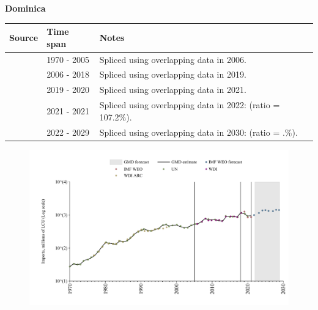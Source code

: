 \documentclass[12pt,a4paper,landscape]{article}
\begin{document}
\begin{adjustbox}{max totalsize={\paperwidth}{\paperheight},center}
\begin{minipage}[t][\textheight][t]{\textwidth}
\vspace*{0.5cm}
{}
\begin{center}
{\Large\bfseries Dominica}
\end{center}
\vspace{0.5cm}
\begin{table}[H]
\centering
\small
\begin{tabular}{|l|l|l|}
\hline
\textbf{Source} & \textbf{Time span} & \textbf{Notes} \\
\hline
\rowcolor{white}\cite{UN}& 1970 - 2005 &Spliced using overlapping data in 2006.\\
\rowcolor{lightgray}\cite{WDI}& 2006 - 2018 &Spliced using overlapping data in 2019.\\
\rowcolor{white}\cite{UN}& 2019 - 2020 &Spliced using overlapping data in 2021.\\
\rowcolor{lightgray}\cite{IMF_WEO}& 2021 - 2021 &Spliced using overlapping data in 2022: (ratio = 107.2\%).\\
\rowcolor{white}\cite{IMF_WEO_forecast}& 2022 - 2029 &Spliced using overlapping data in 2030: (ratio = .\%).\\
\hline
\end{tabular}
\end{table}
\begin{figure}[H]
\centering
\includegraphics[width=\textwidth,height=0.6\textheight,keepaspectratio]{graphs/DMA_imports.pdf}
\end{figure}
\end{minipage}
\end{adjustbox}
\end{document}
